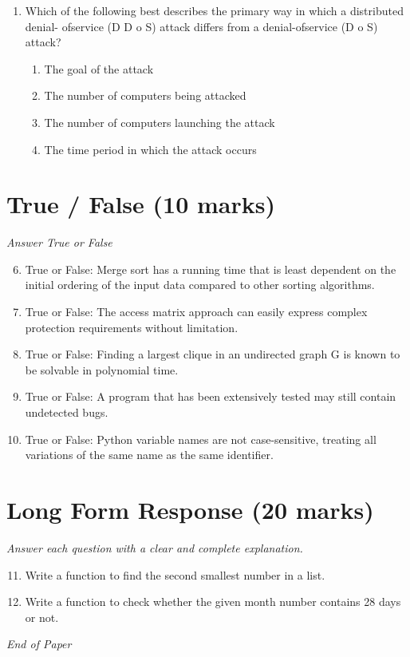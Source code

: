 \documentclass[12pt]{article}
\begin{document}
\begin{enumerate}[label=\arabic*.]
\begin{enumerate}[label=(\alph*)]
    \item To translate Web addresses to host names
    \item To determine the IP address of a given host name
    \item To determine the hardware address of a given host name
    \item To determine the hardware address of a given IP address
\end{enumerate}
\item Which of the following best describes the primary way in which a distributed denial- ofservice (D D o S) attack differs from a denial-ofservice (D o S) attack?
\begin{enumerate}[label=(\alph*)]
    \item The goal of the attack
    \item The number of computers being attacked
    \item The number of computers launching the attack
    \item The time period in which the attack occurs
\end{enumerate}
\end{enumerate}

\section*{True / False (10 marks)}
\textit{Answer True or False}
\begin{enumerate}[label=\arabic*.]
\setcounter{enumi}{5}
\item True or False: Merge sort has a running time that is least dependent on the initial ordering of the input data compared to other sorting algorithms.
\item True or False: The access matrix approach can easily express complex protection requirements without limitation.
\item True or False: Finding a largest clique in an undirected graph G is known to be solvable in polynomial time.
\item True or False: A program that has been extensively tested may still contain undetected bugs.
\item True or False: Python variable names are not case-sensitive, treating all variations of the same name as the same identifier.
\end{enumerate}

\section*{Long Form Response (20 marks)}
\textit{Answer each question with a clear and complete explanation.}
\begin{enumerate}[label=\arabic*.]
\setcounter{enumi}{10}
\item Write a function to find the second smallest number in a list.
\item Write a function to check whether the given month number contains 28 days or not.
\end{enumerate}

\vfill
\noindent\textit{End of Paper}
\end{document}
